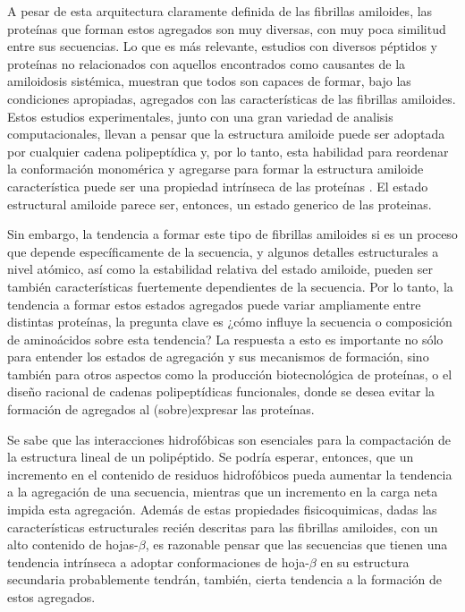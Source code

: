 A pesar de esta arquitectura claramente definida de las fibrillas amiloides, las proteínas que forman estos agregados son muy diversas, con muy poca similitud entre sus secuencias.
Lo que es más relevante, estudios con diversos péptidos y proteínas no relacionados con aquellos encontrados como causantes de la amiloidosis sistémica, muestran que todos son capaces de formar, 
bajo las condiciones apropiadas, agregados con las características de las fibrillas amiloides.
Estos estudios experimentales, junto con una gran variedad de analisis computacionales, llevan a pensar que la estructura amiloide puede ser adoptada por cualquier cadena polipeptídica y, por lo tanto, 
esta habilidad para reordenar la conformación monomérica y agregarse para formar la estructura amiloide característica puede ser una propiedad intrínseca de las proteínas \cite{fandrich2002behaviour}.
El estado estructural amiloide parece ser, entonces, un estado generico de las proteinas.

Sin  embargo, la tendencia a formar este tipo de fibrillas amiloides si es un proceso que depende específicamente de la secuencia, y algunos detalles estructurales a nivel atómico, 
así como la estabilidad relativa del estado amiloide, pueden ser también características fuertemente dependientes de la secuencia. %
Por lo tanto, la tendencia a formar estos estados agregados puede variar ampliamente entre distintas proteínas, la pregunta clave es ¿cómo influye la secuencia o composición de aminoácidos sobre esta tendencia?
La respuesta a esto es importante no sólo para entender los estados de agregación y sus mecanismos de formación, sino también para otros aspectos como 
la producción biotecnológica de proteínas, o el diseño racional de cadenas polipeptídicas funcionales, donde se desea evitar la formación de agregados al (sobre)expresar las proteínas.

Se sabe que las interacciones hidrofóbicas son esenciales para la compactación de la estructura lineal de un polipéptido.
Se podría esperar, entonces, que un incremento en el contenido de residuos hidrofóbicos pueda aumentar la tendencia a la agregación de una secuencia, mientras que un incremento en la carga neta impida esta agregación. 
Además de estas propiedades fisicoquimicas, dadas las características estructurales recién descritas para las fibrillas amiloides, con un alto contenido de hojas-$\beta$, 
es razonable pensar que las secuencias que tienen una tendencia intrínseca a adoptar conformaciones de hoja-$\beta$ en su estructura secundaria probablemente tendrán, también, cierta tendencia a la formación de estos agregados.  


